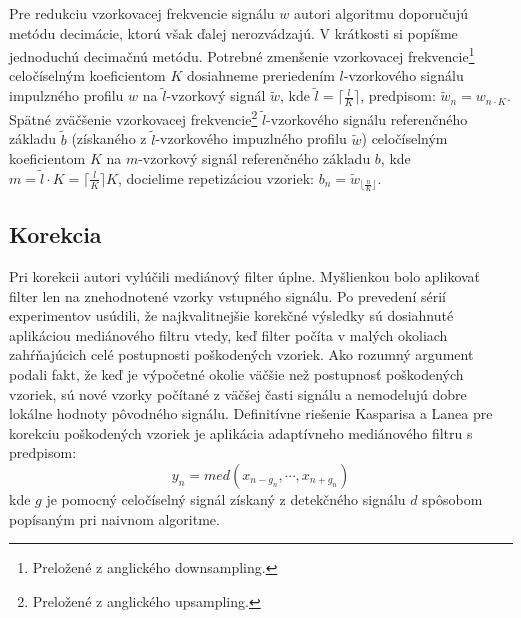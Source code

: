 Pre redukciu vzorkovacej frekvencie signálu $w$ autori algoritmu doporučujú metódu decimácie, ktorú však ďalej nerozvádzajú. V krátkosti si popíšme jednoduchú decimačnú metódu. Potrebné zmenšenie vzorkovacej frekvencie\footnote{Preložené z anglického downsampling.} celočíselným koeficientom $K$ dosiahneme preriedením $l$-vzorkového signálu impulzného profilu $w$ na $\tilde{l}$-vzorkový signál $\tilde{w}$, kde $\tilde{l}=\lceil \frac{l}{K} \rceil$, predpisom: $\tilde{w}_n=w_{n \cdot K}$. Spätné zväčšenie vzorkovacej frekvencie\footnote{Preložené z anglického upsampling.} $\tilde{l}$-vzorkového signálu referenčného základu $\tilde{b}$ (získaného z $\tilde{l}$-vzorkového impuzlného profilu $\tilde{w}$) celočíselným koeficientom $K$ na $m$-vzorkový signál referenčného základu $b$, kde $m=\tilde{l} \cdot K= \lceil \frac{l}{K} \rceil K$, docielime repetizáciou vzoriek: $b_n=\tilde{w}_{\lfloor \frac{n}{K} \rfloor}$.

\subsection{Korekcia}
Pri korekcii autori vylúčili mediánový filter úplne. Myšlienkou bolo aplikovať filter len na znehodnotené vzorky vstupného signálu. Po prevedení sérií experimentov usúdili, že najkvalitnejšie korekčné výsledky sú dosiahnuté aplikáciou mediánového filtru vtedy, keď filter počíta v malých okoliach zahŕňajúcich celé postupnosti poškodených vzoriek. Ako rozumný argument podali fakt, že keď je výpočetné okolie väčšie než postupnosť poškodených vzoriek, sú nové vzorky počítané z väčšej časti signálu a nemodelujú dobre lokálne hodnoty pôvodného signálu. Definitívne riešenie Kasparisa a Lanea pre korekciu poškodených vzoriek je aplikácia adaptívneho mediánového filtru s predpisom: 
$$y_n= med(x_{n-g_n}, \cdots, x_{n+g_n})$$ 
kde $g$ je pomocný celočíselný signál získaný z detekčného signálu $d$ spôsobom popísaným pri naivnom algoritme.


